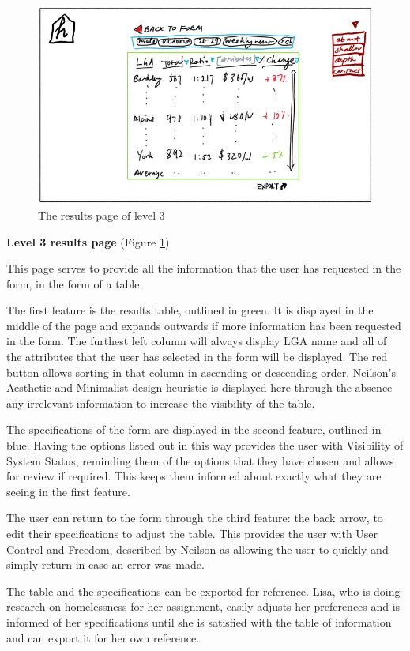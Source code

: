 \documentclass[12pt, a4paper]{article}
\begin{document}
\begin{figure}[h]
\centering
\includegraphics[scale=1]{level3results.jpg} 
\caption{The results page of level 3}
\label{fig:3results}
\end{figure}
\textbf{Level 3 results page} (Figure \ref{fig:3results}) 

This page serves to provide all the information that the user has requested in the form, in the form of a table.

The first feature is the results table, outlined in green. It is displayed in the middle of the page and expands outwards if more information has been requested in the form. The furthest left column will always display LGA name and all of the attributes that the user has selected in the form will be displayed. The red button allows sorting in that column in ascending or descending order. Neilson’s Aesthetic and Minimalist design heuristic is displayed here through the absence any irrelevant information to increase the visibility of the table.

The specifications of the form are displayed in the second feature, outlined in blue. Having the options listed out in this way provides the user with Visibility of System Status, reminding them of the options that they have chosen and allows for review if required. This keeps them informed about exactly what they are seeing in the first feature.

The user can return to the form through the third feature: the back arrow, to edit their specifications to adjust the table. This provides the user with User Control and Freedom, described by Neilson as allowing the user to quickly and simply return in case an error was made.

The table and the specifications can be exported for reference. Lisa, who is doing research on homelessness for her assignment, easily adjusts her preferences and is informed of her specifications until she is satisfied with the table of information and can export it for her own reference.
\end{document}
